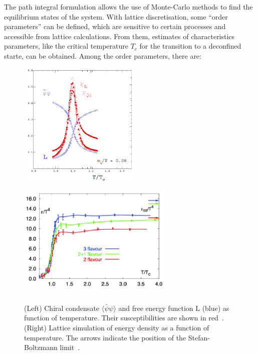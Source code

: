 The path integral 
formulation allows the use of Monte-Carlo methods to find the equilibrium states of the system. 
With lattice discretisation, some ``order parameters'' can be defined, which are 
sensitive to certain processes and accessible from lattice calculations. From them, 
estimates of characteristics parameters, like the critical temperature $T_c$ for the transition
to a deconfined starte, can be obtained. Among the order parameters, there are:
\begin{figure}[!t]
\includegraphics[width=6cm,height=6cm]{FigCap1/Lattice1.png} 
\includegraphics[width=7.5cm,height=5.8cm]{FigCap1/Lattice2.png}
 \caption{(Left) Chiral condensate $\langle \bar{\psi}\psi\rangle$ and free energy function L (blue) as function of temperature. Their susceptibilities are shown in red~\cite{Karsch:2001vs}. (Right) Lattice simulation of energy density as a function of temperature. The arrows indicate the position of the Stefan-Boltzmann limit~\cite{Karsch:2001vs}.}
\label{fig:Lattice}
\end{figure}

